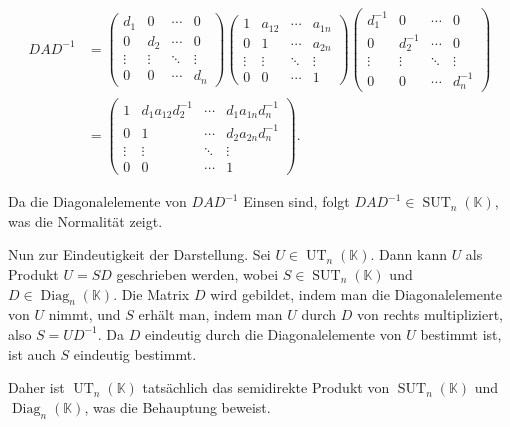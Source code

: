 \documentclass[11pt,a4paper]{article}
\begin{document}
\begin{align*}
DAD^{-1} &= \begin{pmatrix}
d_1 & 0 & \cdots & 0 \\
0 & d_2 & \cdots & 0 \\
\vdots & \vdots & \ddots & \vdots \\
0 & 0 & \cdots & d_n
\end{pmatrix}
\begin{pmatrix}
1 & a_{12} & \cdots & a_{1n} \\
0 & 1 & \cdots & a_{2n} \\
\vdots & \vdots & \ddots & \vdots \\
0 & 0 & \cdots & 1
\end{pmatrix}
\begin{pmatrix}
d_1^{-1} & 0 & \cdots & 0 \\
0 & d_2^{-1} & \cdots & 0 \\
\vdots & \vdots & \ddots & \vdots \\
0 & 0 & \cdots & d_n^{-1}
\end{pmatrix} \\
&= \begin{pmatrix}
1 & d_1 a_{12} d_2^{-1} & \cdots & d_1 a_{1n} d_n^{-1} \\
0 & 1 & \cdots & d_2 a_{2n} d_n^{-1} \\
\vdots & \vdots & \ddots & \vdots \\
0 & 0 & \cdots & 1
\end{pmatrix}.
\end{align*}

Da die Diagonalelemente von $DAD^{-1}$ Einsen sind, folgt $DAD^{-1} \in \operatorname{SUT}_n(\mathbb{K})$, was die Normalität zeigt.

Nun zur Eindeutigkeit der Darstellung. Sei $U \in \operatorname{UT}_n(\mathbb{K})$. Dann kann $U$ als Produkt $U = SD$ geschrieben werden, wobei $S \in \operatorname{SUT}_n(\mathbb{K})$ und $D \in \operatorname{Diag}_n(\mathbb{K})$. Die Matrix $D$ wird gebildet, indem man die Diagonalelemente von $U$ nimmt, und $S$ erhält man, indem man $U$ durch $D$ von rechts multipliziert, also $S = UD^{-1}$. Da $D$ eindeutig durch die Diagonalelemente von $U$ bestimmt ist, ist auch $S$ eindeutig bestimmt.

Daher ist $\operatorname{UT}_n(\mathbb{K})$ tatsächlich das semidirekte Produkt von $\operatorname{SUT}_n(\mathbb{K})$ und $\operatorname{Diag}_n(\mathbb{K})$, was die Behauptung beweist.

\end{document}
